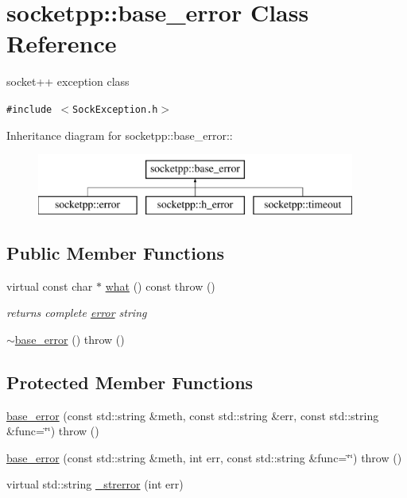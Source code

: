 \hypertarget{classsocketpp_1_1base__error}{
\section{socketpp::base\_\-error Class Reference}
\label{classsocketpp_1_1base__error}
}
socket++ exception class  


{\tt \#include $<$SockException.h$>$}

Inheritance diagram for socketpp::base\_\-error::\begin{figure}[H]
\begin{center}
\leavevmode
\includegraphics[height=2cm]{classsocketpp_1_1base__error}
\end{center}
\end{figure}
\subsection*{Public Member Functions}
\begin{CompactItemize}
\item 
virtual const char $\ast$ \hyperlink{classsocketpp_1_1base__error_a25ad5c1a163784dc72317790ea9c499}{what} () const   throw ()
\begin{CompactList}\small\item\em returns complete \hyperlink{classsocketpp_1_1error}{error} string \item\end{CompactList}\item 
\hyperlink{classsocketpp_1_1base__error_2e6c4d48d426926c79d86a610ba3029b}{$\sim$base\_\-error} ()  throw ()
\end{CompactItemize}
\subsection*{Protected Member Functions}
\begin{CompactItemize}
\item 
\hyperlink{classsocketpp_1_1base__error_bee6b6851dbaecf96259bd2dcaa84ef9}{base\_\-error} (const std::string \&meth, const std::string \&err, const std::string \&func=\char`\"{}\char`\"{})  throw ()
\item 
\hyperlink{classsocketpp_1_1base__error_4be3a2a0a278b7b3ab0e494af7406573}{base\_\-error} (const std::string \&meth, int err, const std::string \&func=\char`\"{}\char`\"{})  throw ()
\item 
virtual std::string \hyperlink{classsocketpp_1_1base__error_2ed9790fc343de92333ab1f0239ffb5f}{\_\-strerror} (int err)
\end{CompactItemize}
